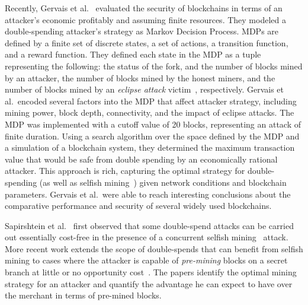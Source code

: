 Recently, Gervais et al.~\cite{Gervais:2016} evaluated the security of blockchains in terms of an attacker's economic profitably and assuming finite resources. They modeled a double-spending attacker's strategy  as Markov Decision Process. MDPs are defined by a finite set of discrete states, a set of actions, a transition function, and a reward function. They defined each  state in the MDP as a tuple representing the following: the status of the fork, and the number of blocks mined by an attacker,  the number of blocks mined by the honest miners, and  the number of blocks mined by an {\em eclipse attack} victim~\cite{Heilman:2015}, respectively.   Gervais et al.\ encoded several factors into the MDP that affect  attacker strategy, including mining power, block depth, connectivity, and the impact of eclipse attacks. The MDP was implemented with a cutoff value of 20 blocks, representing an attack of finite duration. Using a search algorithm over the space defined by the MDP and a simulation of a blockchain system, they determined the maximum transaction value that would be safe from double spending by an economically rational attacker. This  approach is rich, capturing the optimal strategy for  double-spending (as well as selfish mining~\cite{eyal:2014,sapirshtein:2015}) given  network conditions and blockchain parameters.  Gervais et al.\ were able to reach interesting conclusions about the comparative performance and security of several widely used blockchains.

Sapirshtein et al.~\cite{sapirshtein:2015} first observed that some double-spend attacks can be carried out essentially cost-free in the presence of a concurrent selfish mining~\cite{eyal:2014} attack. 
More recent work extends the scope of double-spends that can benefit from selfish mining to cases where the attacker is capable of \emph{pre-mining} blocks on a secret branch at little or no opportunity cost~\cite{Sompolinsky:2016}. The papers identify the optimal mining strategy for an attacker and quantify the advantage he can expect to have over the merchant in terms of pre-mined blocks.

